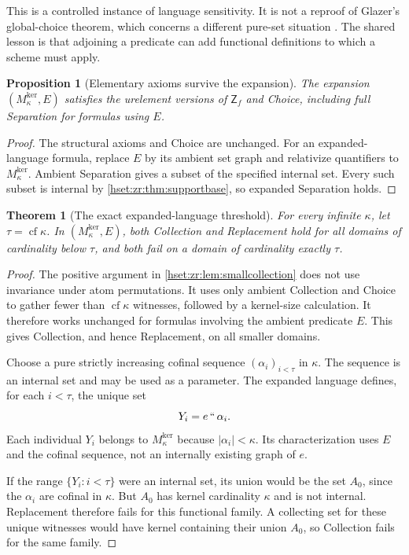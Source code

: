 \documentclass[11pt,letterpaper]{article}
\newtheorem{theorem}{Theorem}[section]
\newtheorem{proposition}[proposition]{Proposition}\aliascntresetthe{proposition}
\theoremstyle{definition}
\theoremstyle{remark}
\newcommand{\cf}{\operatorname{cf}}
\newcommand{\Zf}{\mathsf{Z}_{\!f}}
\newcommand{\Mker}{M^{\mathrm{ker}}}
\begin{document}
This is a controlled instance of language sensitivity. It is not a reproof of Glazer's global-choice theorem, which concerns a different pure-set situation \cite{GlazerChoice}. The shared lesson is that adjoining a predicate can add functional definitions to which a scheme must apply.

\begin{proposition}[Elementary axioms survive the expansion]
\label{hset:zr:prop:expandedseparation}
The expansion $(\Mker_\kappa,E)$ satisfies the urelement versions of $\Zf$ and Choice, including full Separation for formulas using $E$.
\end{proposition}
\begin{proof}
The structural axioms and Choice are unchanged. For an expanded-language formula, replace $E$ by its ambient set graph and relativize quantifiers to $\Mker_\kappa$. Ambient Separation gives a subset of the specified internal set. Every such subset is internal by \cref{hset:zr:thm:supportbase}, so expanded Separation holds.
\end{proof}

\begin{theorem}[The exact expanded-language threshold]
\label{hset:zr:thm:expandedthreshold}
For every infinite $\kappa$, let $\tau=\cf\kappa$. In $(\Mker_\kappa,E)$, both Collection and Replacement hold for all domains of cardinality below $\tau$, and both fail on a domain of cardinality exactly $\tau$.
\end{theorem}
\begin{proof}
The positive argument in \cref{hset:zr:lem:smallcollection} does not use invariance under atom permutations. It uses only ambient Collection and Choice to gather fewer than $\cf\kappa$ witnesses, followed by a kernel-size calculation. It therefore works unchanged for formulas involving the ambient predicate $E$. This gives Collection, and hence Replacement, on all smaller domains.

Choose a pure strictly increasing cofinal sequence $(\alpha_i)_{i<\tau}$ in $\kappa$. The sequence is an internal set and may be used as a parameter. The expanded language defines, for each $i<\tau$, the unique set
\[
Y_i=e\,``\,\alpha_i.
\]
Each individual $Y_i$ belongs to $\Mker_\kappa$ because $|\alpha_i|<\kappa$. Its characterization uses $E$ and the cofinal sequence, not an internally existing graph of $e$.

If the range $\{Y_i:i<\tau\}$ were an internal set, its union would be the set $A_0$, since the $\alpha_i$ are cofinal in $\kappa$. But $A_0$ has kernel cardinality $\kappa$ and is not internal. Replacement therefore fails for this functional family. A collecting set for these unique witnesses would have kernel containing their union $A_0$, so Collection fails for the same family.
\end{proof}
\end{document}

